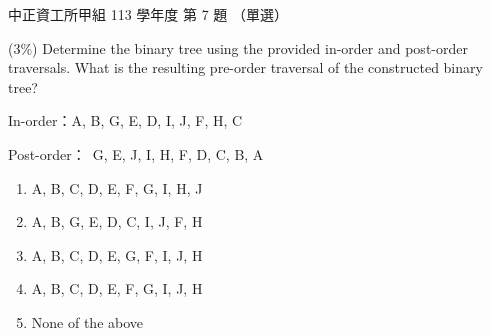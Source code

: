 \begin{pastexam}[label={px:ccu-113-swa-07}]{中正資工所甲組 113 學年度 第 7 題}
（單選）

(3\%) Determine the binary tree using the provided in-order and post-order traversals. What is the resulting pre-order traversal of the constructed binary tree?

In-order：A, B, G, E, D, I, J, F, H, C

Post-order：\ G, E, J, I, H, F, D, C, B, A
\begin{enumerate}[label=\Alph*.]
\item A, B, C, D, E, F, G, I, H, J
\item A, B, G, E, D, C, I, J, F, H
\item A, B, C, D, E, G, F, I, J, H
\item A, B, C, D, E, F, G, I, J, H
\item None of the above
\end{enumerate}
\end{pastexam}

